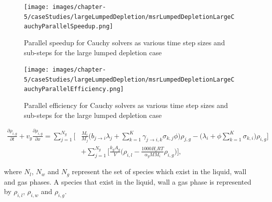 \clearpage

\begin{figure}[p]
    \centering
    \texttt{[image: images/chapter-5/caseStudies/largeLumpedDepletion/msrLumpedDepletionLargeCauchyParallelSpeedup.png]}
    \caption{Parallel speedup for Cauchy solvers as various time step sizes and sub-steps for the large lumped depletion case}
    \label{fig:large_lumped_depletion_cauchy_speedup}
\end{figure}

\clearpage

\begin{figure}[p]
    \centering
    \texttt{[image: images/chapter-5/caseStudies/largeLumpedDepletion/msrLumpedDepletionLargeCauchyParallelEfficiency.png]}
    \caption{Parallel efficiency for Cauchy solvers as various time step sizes and sub-steps for the large lumped depletion case}
    \label{fig:large_lumped_depletion_cauchy_parallel_eff}
\end{figure}

\clearpage


\begin{equation}
\begin{split}
    \frac{\partial \rho_{i,g}}{\partial t} + v_{y}\frac{\partial \rho_{i,g}}{\partial x}
    =
    \sum_{j=1}^{N_{g}}\bigg[&\frac{M_{i}}{M_{j}}\bigg(b_{j\rightarrow i}\lambda_{j} + 
    \sum_{k=1}^{K}\gamma_{j\rightarrow i,k}\sigma_{k,j}\phi \bigg)\rho_{j, g}
    - \bigg(\lambda_{i} + \phi\sum_{k=1}^{K} \sigma_{k,i}\bigg)\rho_{i, g} \bigg]\\ & + \sum_{j=1}^{N_{g}} \bigg[  \frac{k_{g}A_{g}}{V}\bigg(\rho_{i,l} - \frac{1000H_{i}RT}{\alpha_{g}MM_{i}}\rho_{i, g}\bigg) \bigg],
    \label{eq:MSR2DDepletionSmallGasPhase}
\end{split}
\end{equation}

\noindent where $N_{l}$, $N_{w}$ and $N_{g}$ represent the set of species which exist in the liquid, wall and gas phases. A species that exist in the liquid, wall a gas phase is represented by $\rho_{i,l}$, $\rho_{i,w}$ and $\rho_{i,g}$.

